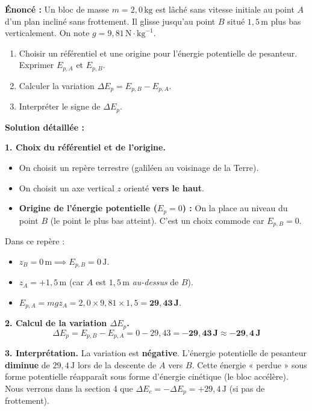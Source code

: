 \documentclass[11pt]{article}
\begin{document}
\begin{exoresolu}
\textbf{Énoncé :} Un bloc de masse $m = 2,0\,\text{kg}$ est lâché sans vitesse initiale au point $A$ d'un plan incliné sans frottement. Il glisse jusqu'au point $B$ situé $1,5\,\text{m}$ plus bas verticalement. On note $g = 9,81\,\text{N}\cdot\text{kg}^{-1}$.
\begin{enumerate}
    \item Choisir un référentiel et une origine pour l'énergie potentielle de pesanteur. Exprimer $E_{p,A}$ et $E_{p,B}$.
    \item Calculer la variation $\Delta E_p = E_{p,B} - E_{p,A}$.
    \item Interpréter le signe de $\Delta E_p$.
\end{enumerate}

\tcblower

\textbf{Solution détaillée :}

\textbf{1. Choix du référentiel et de l'origine.}
\begin{itemize}
    \item On choisit un repère terrestre (galiléen au voisinage de la Terre).
    \item On choisit un axe vertical $z$ orienté \textbf{vers le haut}.
    \item \textbf{Origine de l'énergie potentielle ($E_p=0$) :} On la place au niveau du point $B$ (le point le plus bas atteint). C'est un choix commode car $E_{p,B}=0$.
\end{itemize}
Dans ce repère :
\begin{itemize}
    \item $z_B = 0\,\text{m} \implies E_{p,B} = 0\,\text{J}$.
    \item $z_A = +1,5\,\text{m}$ (car $A$ est $1,5\,\text{m}$ \emph{au-dessus} de $B$).
    \item $E_{p,A} = m g z_A = 2,0 \times 9,81 \times 1,5 = \mathbf{29,43\,J}$.
\end{itemize}

\textbf{2. Calcul de la variation $\Delta E_p$.}
\[
\Delta E_p = E_{p,B} - E_{p,A} = 0 - 29,43 = \mathbf{-29,43\,J} \approx \mathbf{-29,4\,J}
\]

\textbf{3. Interprétation.}
La variation est \textbf{négative}. L'énergie potentielle de pesanteur \textbf{diminue} de $29,4\,\text{J}$ lors de la descente de $A$ vers $B$. Cette énergie « perdue » sous forme potentielle réapparaît sous forme d'énergie cinétique (le bloc accélère). Nous verrons dans la section 4 que $\Delta E_c = -\Delta E_p = +29,4\,\text{J}$ (si pas de frottement).


\end{exoresolu}
\end{document}
